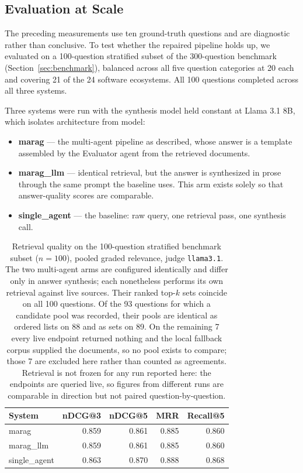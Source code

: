 \documentclass[acmsmall,review,anonymous,screen]{acmart}
\begin{document}
\subsection{Evaluation at Scale}\label{sec:scaled-eval}

The preceding measurements use ten ground-truth questions and are diagnostic
rather than conclusive. To test whether the repaired pipeline holds up, we
evaluated on a 100-question stratified subset of the 300-question benchmark
(Section~\ref{sec:benchmark}), balanced across all five question categories at 20
each and covering 21 of the 24 software ecosystems. All 100 questions completed
across all three systems.

Three systems were run with the synthesis model held constant at Llama 3.1 8B,
which isolates architecture from model:

\begin{itemize}
  \item \textbf{marag} --- the multi-agent pipeline as described, whose answer is
  a template assembled by the Evaluator agent from the retrieved documents.
  \item \textbf{marag\_llm} --- identical retrieval, but the answer is
  synthesized in prose through the same prompt the baseline uses. This arm
  exists solely so that answer-quality scores are comparable.
  \item \textbf{single\_agent} --- the baseline: raw query, one retrieval pass,
  one synthesis call.
\end{itemize}

\begin{table}[t]
\caption{Retrieval quality on the 100-question stratified benchmark subset
($n=100$), pooled graded relevance, judge \texttt{llama3.1}. The two
multi-agent arms are configured identically and differ only in answer synthesis;
each nonetheless performs its own retrieval against live sources. Their ranked
top-$k$ sets coincide on all 100 questions. Of the 93 questions for which a
candidate pool was recorded, their pools are identical as ordered lists on 88
and as sets on 89. On the remaining 7 every live endpoint returned nothing and
the local fallback corpus supplied the documents, so no pool exists to compare;
those 7 are excluded here rather than counted as agreements. Retrieval is not
frozen for any run reported here: the endpoints are queried live, so figures
from different runs are comparable in direction but not paired
question-by-question.}
\label{tab:scaled-retrieval}
\begin{tabular}{lrrrr}
\toprule
System & nDCG@3 & nDCG@5 & MRR & Recall@5 \\
\midrule
marag         & 0.859 & 0.861 & 0.885 & 0.860 \\
marag\_llm    & 0.859 & 0.861 & 0.885 & 0.860 \\
single\_agent & 0.863 & 0.870 & 0.888 & 0.868 \\
\bottomrule
\end{tabular}
\end{table}
\end{document}
